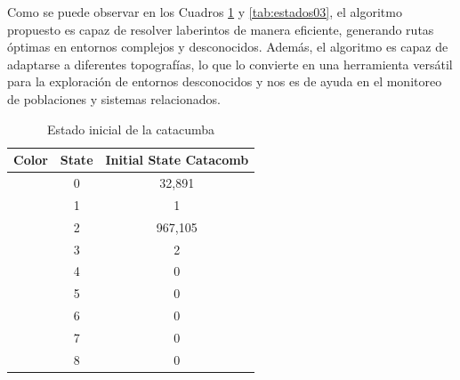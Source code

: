         \clearpage
        \vskip 0.5cm
        Como se puede observar en los Cuadros \ref{tab:estados02} y \ref{tab:estados03}, el algoritmo propuesto es capaz de resolver laberintos de manera eficiente, 
            generando rutas \'optimas en entornos complejos y desconocidos. Adem\'as, el algoritmo es capaz de adaptarse a diferentes topograf\'ias, 
            lo que lo convierte en una herramienta vers\'atil para la exploraci\'on de entornos desconocidos y nos es de ayuda en el monitoreo de poblaciones y sistemas relacionados.
        \vskip 0.5cm
        \begin{table}[h]
            \begin{center}
                \begin{tabular}{|c|c|c|}
                    \hline
                    \textbf{Color}&\textbf{State}&\textbf{Initial State Catacomb} \\
                    \hline
                    \cellcolor{blue} & 0 & 32,891  \\
                    \cellcolor{royalblue} & 1 & 1 \\
                    \cellcolor{red} & 2 & 967,105 \\
                    \cellcolor{black} & 3 & 2 \\
                    \cellcolor{yellow} & 4 & 0 \\
                    \cellcolor{darkgreen} & 5 & 0 \\
                    \cellcolor{lemon} & 6 & 0 \\
                    \cellcolor{darkgray} & 7 & 0 \\
                    \cellcolor{green} & 8 & 0 \\
                    \hline
                \end{tabular}
            \end{center}
            \caption{Estado inicial de la catacumba}
            \label{tab:estados02}
        \end{table}
